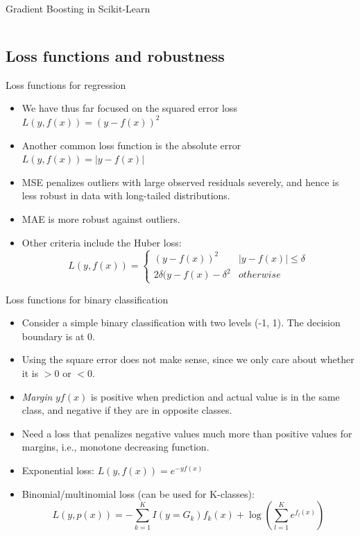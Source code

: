 \documentclass[aspectratio=169]{beamer}
\begin{document}
\begin{frame}[fragile]{Gradient Boosting in Scikit-Learn}
\inputminted{python}{example_sklearn_gradient_boosting.py}
\end{frame}


\subsection{Loss functions and robustness}


\begin{frame}{Loss functions for regression}
    \begin{itemize}
        \item We have thus far focused on the squared error loss $L(y, f(x)) = (y - f(x))^2$
        \item Another common loss function is the absolute error $L(y, f(x)) = |y - f(x)|$
        \item MSE penalizes outliers with large observed residuals severely, and hence is less robust in data with long-tailed distributions.
        \item MAE is more robust against outliers.
        \item Other criteria include the Huber loss:
        \begin{equation*}
            L(y, f(x)) = \left\{ \begin{array}{cc}
                (y - f(x))^2 & |y-f(x)| \leq \delta \\
                2\delta (y-f(x) - \delta^2 & otherwise 
            \end{array}\right.
        \end{equation*}
    \end{itemize}
\end{frame}


\begin{frame}{Loss functions for binary classification}
    \begin{itemize}
        \item Consider a simple binary classification with two levels (-1, 1). The decision boundary is at 0.
        \item Using the square error does not make sense, since we only care about whether it is $>0$ or $<0$.
        \item \textit{Margin} $yf(x)$ is positive when prediction and actual value is in the same class, and negative if they are in opposite classes.
        \item Need a loss that penalizes negative values much more than positive values for margins, i.e., monotone decreasing function.
        \item Exponential loss: $L(y, f(x)) = e^{-yf(x)}$
        \item Binomial/multinomial loss (can be used for K-classes):
        \begin{equation*}
            L(y, p(x)) = -\sum_{k=1}^K I(y=G_k)f_k(x) + \log \left(\sum_{l=1}^K e^{f_l(x)}\right)
        \end{equation*}
    \end{itemize}
\end{frame}
\end{document}
